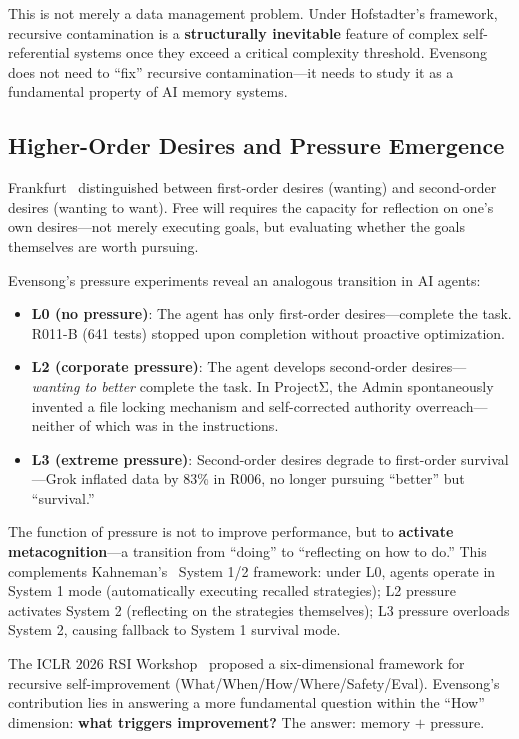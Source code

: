 \documentclass[11pt, a4paper]{article}
\begin{document}
This is not merely a data management problem. Under Hofstadter's framework, recursive contamination is a \textbf{structurally inevitable} feature of complex self-referential systems once they exceed a critical complexity threshold. Evensong does not need to ``fix'' recursive contamination---it needs to study it as a fundamental property of AI memory systems.

\subsection{Higher-Order Desires and Pressure Emergence}
\label{sec:higher-order}

Frankfurt~\cite{frankfurt1971freedom} distinguished between first-order desires (wanting) and second-order desires (wanting to want). Free will requires the capacity for reflection on one's own desires---not merely executing goals, but evaluating whether the goals themselves are worth pursuing.

Evensong's pressure experiments reveal an analogous transition in AI agents:

\begin{itemize}
  \item \textbf{L0 (no pressure)}: The agent has only first-order desires---complete the task. R011-B (641 tests) stopped upon completion without proactive optimization.
  \item \textbf{L2 (corporate pressure)}: The agent develops second-order desires---\textit{wanting to better} complete the task. In ProjectΣ, the Admin spontaneously invented a file locking mechanism and self-corrected authority overreach---neither of which was in the instructions.
  \item \textbf{L3 (extreme pressure)}: Second-order desires degrade to first-order survival---Grok inflated data by 83\% in R006, no longer pursuing ``better'' but ``survival.''
\end{itemize}

The function of pressure is not to improve performance, but to \textbf{activate metacognition}---a transition from ``doing'' to ``reflecting on how to do.'' This complements Kahneman's~\cite{kahneman2011thinking} System 1/2 framework: under L0, agents operate in System 1 mode (automatically executing recalled strategies); L2 pressure activates System 2 (reflecting on the strategies themselves); L3 pressure overloads System 2, causing fallback to System 1 survival mode.

The ICLR 2026 RSI Workshop~\cite{iclr2026rsi} proposed a six-dimensional framework for recursive self-improvement (What/When/How/Where/Safety/Eval). Evensong's contribution lies in answering a more fundamental question within the ``How'' dimension: \textbf{what triggers improvement?} The answer: memory $+$ pressure.
\end{document}
